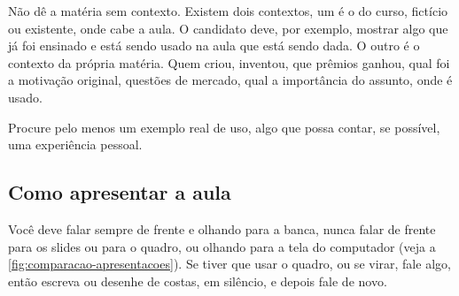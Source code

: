 \documentclass{article}
\begin{document}
Não dê a matéria sem contexto. Existem dois contextos, um é o do curso, fictício ou existente, onde cabe a aula. O candidato deve, por exemplo, mostrar algo que já foi ensinado e está sendo usado na aula que está sendo dada. O outro é o contexto da própria matéria. Quem criou, inventou, que prêmios ganhou, qual foi a motivação original, questões de mercado, qual a importância do assunto, onde é usado.

Procure pelo menos um exemplo real de uso, algo que possa contar, se possível, uma experiência pessoal.

\subsection{Como apresentar a aula}

Você deve falar sempre de frente e olhando para a banca, nunca falar de frente para os slides ou para o quadro, ou olhando para a tela do computador (veja a \autoref{fig:comparacao-apresentacoes}). Se tiver que usar o quadro, ou se virar, fale algo, então escreva ou desenhe de costas, em silêncio, e depois fale de novo.
\end{document}
